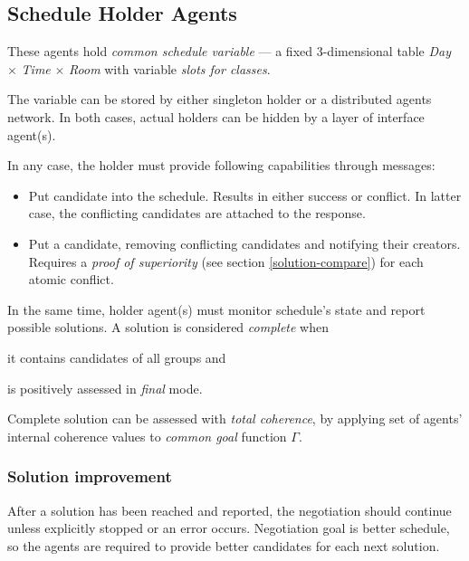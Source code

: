 \documentclass[../../ThesisDoc]{subfiles}
\begin{document}
\providecommand{\rootdir}{../..}


\subsection{Schedule Holder Agents}

These agents hold \emph{common schedule variable} --- a fixed 3-dimensional table
\emph{Day} $\times$ \emph{Time} $\times$ \emph{Room} with variable
\emph{slots for classes}.

The variable can be stored by either singleton holder or a distributed agents network.
In both cases, actual holders can be hidden by a layer of interface agent(s).

In any case, the holder must provide following capabilities through messages:
\begin{itemize}
  \item Put candidate into the schedule. Results in either success or conflict.
        In latter case, the conflicting candidates are attached to the response.
  \item Put a candidate, removing conflicting candidates and notifying their
        creators. Requires a \emph{proof of superiority} (see section \ref{solution-compare})
        for each atomic conflict.
\end{itemize}

\medskip
\noindent
In the same time, holder agent(s) must monitor schedule's state and report
possible solutions. A solution is considered \emph{complete} when
\begin{enumerate*}
  \item it contains candidates of all groups and
  \item is positively assessed in \emph{final} mode.
\end{enumerate*}

Complete solution can be assessed with \emph{total coherence}, by applying
set of agents' internal coherence values to \emph{common goal} function $\Gamma$.

\subsubsection{Solution improvement}
\label{sec:solution-better}

After a solution has been reached and reported, the negotiation should continue
unless explicitly stopped or an error occurs. Negotiation goal is better
schedule, so the agents are required to provide better candidates for each next
solution.
\end{document}
